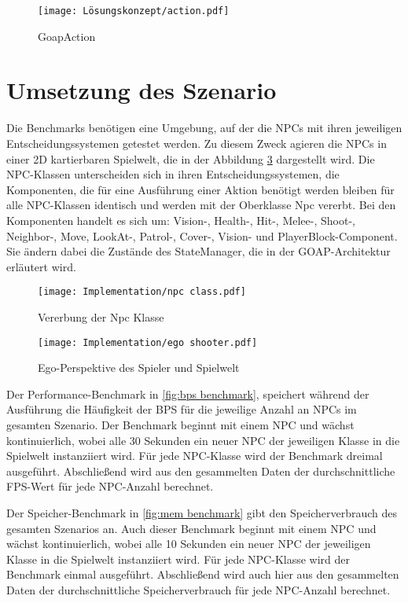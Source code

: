 \begin{figure}[h]
  \centering
  \texttt{[image: Lösungskonzept/action.pdf]}
	\captionsetup{justification=justified, format=plain}
  \caption{GoapAction}
  \label{fig:GoapAction}
\end{figure}








\section{Umsetzung des Szenario}
\label{chap:implementierung szenario}

Die Benchmarks benötigen eine Umgebung, auf der die NPCs mit ihren jeweiligen Entscheidungssystemen getestet werden. Zu diesem Zweck agieren die NPCs in einer 2D kartierbaren Spielwelt, die in der Abbildung \ref{fig:ego shooter} dargestellt wird. Die NPC-Klassen unterscheiden sich in ihren Entscheidungssystemen, die Komponenten, die für eine Ausführung einer Aktion benötigt werden bleiben für alle NPC-Klassen identisch und werden mit der Oberklasse Npc vererbt. Bei den Komponenten handelt es sich um: Vision-, Health-, Hit-, Melee-, Shoot-, Neighbor-, Move, LookAt-, Patrol-, Cover-, Vision- und PlayerBlock-Component. Sie ändern dabei die Zustände des StateManager, die in der GOAP-Architektur erläutert wird.

\begin{figure}[h]
  \centering
  \texttt{[image: Implementation/npc class.pdf]}
	\captionsetup{justification=justified, format=plain}
  \caption{Vererbung der Npc Klasse}
  \label{fig:npc class}
\end{figure}

\begin{figure}[h]
  \centering
  \texttt{[image: Implementation/ego shooter.pdf]}
	\captionsetup{justification=justified, format=plain}
  \caption{Ego-Perspektive des Spieler und Spielwelt}
  \label{fig:ego shooter}
\end{figure}

Der Performance-Benchmark in \ref{fig:bps benchmark}, speichert während der Ausführung die Häufigkeit der BPS für die jeweilige Anzahl an NPCs im gesamten Szenario. Der Benchmark beginnt mit einem NPC und wächst kontinuierlich, wobei alle 30 Sekunden ein neuer NPC der jeweiligen Klasse in die Spielwelt instanziiert wird. Für jede NPC-Klasse wird der Benchmark dreimal ausgeführt. Abschlie\ss{}end wird aus den gesammelten Daten der durchschnittliche FPS-Wert für jede NPC-Anzahl berechnet.

Der Speicher-Benchmark in \ref{fig:mem benchmark} gibt den Speicherverbrauch des gesamten Szenarios an. Auch dieser Benchmark beginnt mit einem NPC und wächst kontinuierlich, wobei alle 10 Sekunden ein neuer NPC der jeweiligen Klasse in die Spielwelt instanziiert wird. Für jede NPC-Klasse wird der Benchmark einmal ausgeführt. Abschlie\ss{}end wird auch hier aus den gesammelten Daten der durchschnittliche Speicherverbrauch für jede NPC-Anzahl berechnet.
